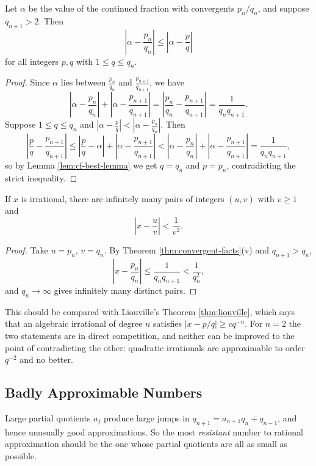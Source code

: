 \documentclass[a4paper]{scrartcl}
\begin{document}
\begin{theorem}\label{thm:cf-best}
	Let $\alpha$ be the value of the continued fraction with convergents $p_n/q_n$, and suppose $q_{n+1}>2$. Then
	$$\left|\alpha-\frac{p_n}{q_n}\right| \leq \left|\alpha-\frac pq\right|$$
	for all integers $p,q$ with $1\leq q\leq q_n$.
\end{theorem}

\begin{proof}
	Since $\alpha$ lies between $\frac{p_n}{q_n}$ and $\frac{p_{n+1}}{q_{n+1}}$, we have
	$$\left|\alpha-\frac{p_n}{q_n}\right| + \left|\alpha - \frac{p_{n+1}}{q_{n+1}}\right| = \left|\frac{p_n}{q_n}-\frac{p_{n+1}}{q_{n+1}}\right| = \frac{1}{q_nq_{n+1}}.$$
	Suppose $1\leq q \leq q_n$ and $\left|\alpha-\frac pq\right| < \left|\alpha-\frac{p_n}{q_n}\right|$. Then
	$$\left|\frac pq - \frac{p_{n+1}}{q_{n+1}}\right| \leq \left|\frac pq-\alpha\right|+\left|\alpha-\frac{p_{n+1}}{q_{n+1}}\right| < \left|\alpha-\frac{p_n}{q_n}\right|+\left|\alpha-\frac{p_{n+1}}{q_{n+1}}\right| = \frac{1}{q_nq_{n+1}},$$
	so by Lemma \ref{lem:cf-best-lemma} we get $q = q_n$ and $p=p_n$, contradicting the strict inequality.
\end{proof}

\begin{corollary}\label{cor:dirichlet}
	If $x$ is irrational, there are infinitely many pairs of integers $(u,v)$ with $v\geq1$ and
	$$\left|x - \frac uv\right| < \frac{1}{v^2}.$$
\end{corollary}

\begin{proof}
	Take $u=p_n$, $v=q_n$. By Theorem \ref{thm:convergent-facts}(v) and $q_{n+1}>q_n$,
	$$\left|x-\frac{p_n}{q_n}\right|\leq\frac{1}{q_nq_{n+1}}<\frac{1}{q_n^2},$$
	and $q_n\to\infty$ gives infinitely many distinct pairs.
\end{proof}

This should be compared with Liouville's Theorem \ref{thm:liouville}, which says that an algebraic irrational of degree $n$ satisfies $|x-p/q|\geq cq^{-n}$. For $n=2$ the two statements are in direct competition, and neither can be improved to the point of contradicting the other: quadratic irrationals are approximable to order $q^{-2}$ and no better.

\subsection{Badly Approximable Numbers}

Large partial quotients $a_j$ produce large jumps in $q_{n+1}=a_{n+1}q_n+q_{n-1}$, and hence unusually good approximations. So the most \emph{resistant} number to rational approximation should be the one whose partial quotients are all as small as possible.
\end{document}
